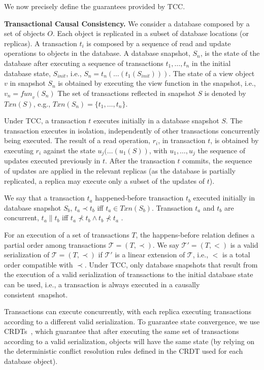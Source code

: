 \documentclass[sigplan,twocolumn,review,anonymous]{acmart}
\begin{document}
We now precisely define the guarantees provided by TCC.

\noindent
\textbf{Transactional Causal Consistency.}
We consider a database composed by a set of objects $O$. Each object is replicated in a subset of 
database locations (or replicas).
A transaction $t_i$ is composed by a sequence of read and update operations to objects in the database.
A database snapshot, $S_n$, is the state of the database after executing a sequence of 
transactions $t_1,\ldots,t_n$ in the initial database state, $S_{init}$, i.e., $S_n =
t_n(\ldots(t_1(S_{init})))$.  The state of a view object $v$ in snapshot $S_n$ is obtained by executing
the view function in the snapshot, i.e.,  $v_n = \mathit{fun}_v(S_n)$
The set of transactions reflected in snapshot $S$ is denoted by $Txn(S)$,
e.g., $Txn(S_n) = \{t_1,\ldots,t_n\}$.

Under TCC, a transaction $t$  executes initially in a database snapshot $S$.
The transaction executes in isolation, independently of other transactions concurrently being executed. 
The result of a read operation, $r_i$, in transaction $t$, is obtained by executing $r_i$
against the state $u_j(\ldots(u_1(S))$, with $u_1,\ldots,u_j$ the sequence of updates executed 
previously in $t$. After the transaction $t$ commits, the sequence of updates 
are applied
in the relevant replicas (as the database is partially replicated, a replica may execute only a subset 
of the updates of $t$).

We say that a transaction $t_a$
happened-before transaction $t_b$ executed initially in  database snapshot $S_b$,
$t_a \! \prec \! t_b$ iff \mbox{$t_a \!\in \! Txn(S_b)$}.
Transaction $t_a$ and $t_b$ are concurrent, $t_a \parallel  t_b$ iff
$t_a \! \not \prec \! t_b  \wedge  t_b \! \not \prec \! t_a$ \cite{lamport78}.

For an execution of a  set of transactions $T$, the happens-before relation defines
a partial order among transactions \mbox{$\mathcal{T} = (T,\prec)$}.
We say $\mathcal{T'} = (T,<)$ is a valid serialization of $\mathcal{T} = (T,\prec)$
if $\mathcal{T'}$ is a linear extension of $\mathcal{T}$, i.e., $<$ is a total order
compatible with $\prec$.
Under TCC, only database snapshots that result from the 
execution of a valid serialization of transactions to the initial database state can be used, i.e.,
a transaction is always executed in a causally \mbox{consistent snapshot.}

Transactions can execute concurrently, with each replica
executing transactions according to a different valid
serialization.
To guarantee state convergence, we use CRDTs~\cite{crdt,walter},
which guarantee that after executing the same set of transactions according
to a valid serialization, objects will have the same state (by relying on the
deterministic conflict resolution rules defined in the CRDT used for each database object).
\end{document}
